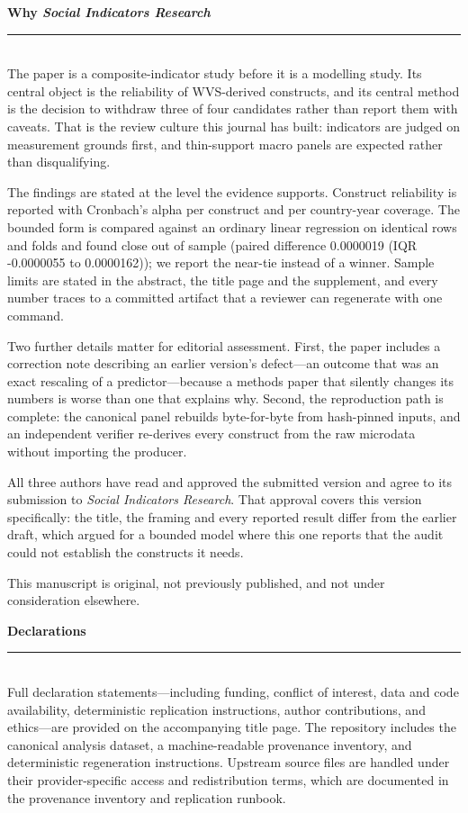\documentclass[11pt]{article}
\newcommand{\SubRule}{{\color{black!65}\rule{\linewidth}{0.4pt}}}
\newcommand{\SmallHeading}[1]{\needspace{5\baselineskip}\vspace{0.85em}\noindent\textbf{#1}\\[-0.25em]\SubRule\\[0.45em]}
\begin{document}
\SmallHeading{Why \emph{Social Indicators Research}}

\noindent The paper is a composite-indicator study before it is a modelling study. Its central object is the reliability of WVS-derived constructs, and its central method is the decision to withdraw three of four candidates rather than report them with caveats. That is the review culture this journal has built: indicators are judged on measurement grounds first, and thin-support macro panels are expected rather than disqualifying.

\noindent The findings are stated at the level the evidence supports. Construct reliability is reported with Cronbach's alpha per construct and per country-year coverage. The bounded form is compared against an ordinary linear regression on identical rows and folds and found close out of sample (paired difference 0.0000019 (IQR -0.0000055 to 0.0000162)); we report the near-tie instead of a winner. Sample limits are stated in the abstract, the title page and the supplement, and every number traces to a committed artifact that a reviewer can regenerate with one command.

\noindent Two further details matter for editorial assessment. First, the paper includes a correction note describing an earlier version's defect---an outcome that was an exact rescaling of a predictor---because a methods paper that silently changes its numbers is worse than one that explains why. Second, the reproduction path is complete: the canonical panel rebuilds byte-for-byte from hash-pinned inputs, and an independent verifier re-derives every construct from the raw microdata without importing the producer.

\noindent All three authors have read and approved the submitted version and agree to its submission to \emph{Social Indicators Research}. That approval covers this version specifically: the title, the framing and every reported result differ from the earlier draft, which argued for a bounded model where this one reports that the audit could not establish the constructs it needs.

\noindent This manuscript is original, not previously published, and not under consideration elsewhere.

\par\vspace{0.9\baselineskip}

\noindent\textbf{Declarations}\\[-0.2em]
{\color{black!65}\rule{\linewidth}{0.4pt}}\\[0.4em]
\noindent Full declaration statements---including funding, conflict of interest, data and code availability, deterministic replication instructions, author contributions, and ethics---are provided on the accompanying title page. The repository includes the canonical analysis dataset, a machine-readable provenance inventory, and deterministic regeneration instructions. Upstream source files are handled under their provider-specific access and redistribution terms, which are documented in the provenance inventory and replication runbook.
\end{document}

